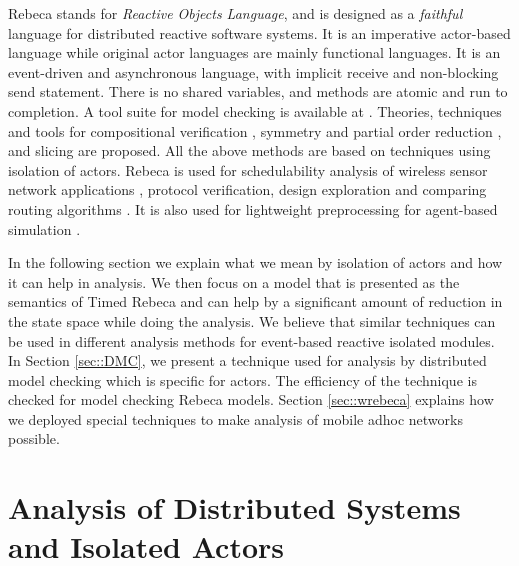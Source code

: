
Rebeca stands for \textit{Reactive Objects Language}, and is designed as a \textit{faithful} language for  distributed reactive software systems.
It is an imperative actor-based language while original actor languages are mainly functional languages. It is an event-driven and asynchronous language, with implicit receive and non-blocking send statement. There is no shared variables, and methods are atomic and run to completion.
A  tool suite for model checking is available at \cite{RebecaSite}. Theories, techniques and tools for compositional verification \cite{DBLP:journals/jucs/SirjaniMSB05}, symmetry and partial order reduction \cite{DBLP:journals/acta/JaghooriSMKM10}, and slicing \cite{DBLP:journals/scp/SabouriS10}  are proposed. All the above methods are based on techniques using isolation of actors.
Rebeca is used for schedulability analysis of wireless sensor network applications \cite{DBLP:journals/sttt/KhamespanahSMA18}, protocol verification\cite{FOAC}, design exploration  and comparing routing algorithms \cite{DBLP:journals/eceasst/sharifiMMS13}. It is also used for lightweight preprocessing for agent-based simulation \cite{DBLP:journals/scp/BerardinisFJS18}. 


In the following section we explain what we mean by isolation of actors and how it can help in analysis. We then focus on a model that is presented as the semantics of Timed Rebeca and can help by a significant amount of reduction in the state space while doing the analysis. We believe that similar techniques can be used in different analysis methods for event-based reactive isolated modules. 
%
In Section \ref{sec::DMC}, we present a technique used for analysis by distributed model checking which is specific for actors. The efficiency of the technique is checked for model checking Rebeca models.
%
Section \ref{sec::wrebeca} explains how we deployed special techniques to make analysis of  mobile adhoc networks possible.

\section{Analysis of Distributed Systems and Isolated Actors}

